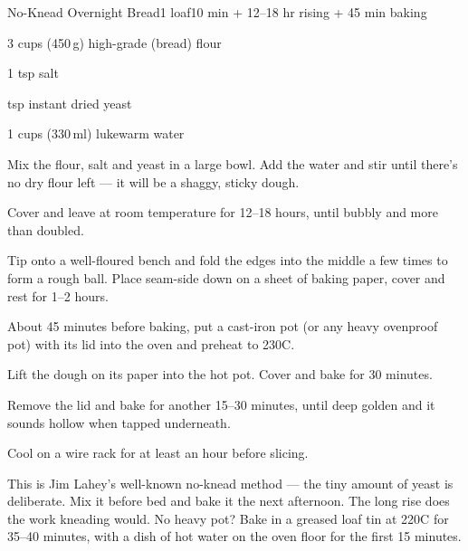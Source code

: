 \begin{recipebox}{No-Knead Overnight Bread}{1 loaf}{10 min + 12--18 hr rising + 45 min baking}
\begin{ingredients}
  \item 3 cups (450\,g) high-grade (bread) flour
  \item 1 tsp salt
  \item {} tsp instant dried yeast
  \item 1 cups (330\,ml) lukewarm water
\end{ingredients}

\begin{method}
  \item Mix the flour, salt and yeast in a large bowl. Add the water and stir until there's no dry flour left --- it will be a shaggy, sticky dough.
  \item Cover and leave at room temperature for 12--18 hours, until bubbly and more than doubled.
  \item Tip onto a well-floured bench and fold the edges into the middle a few times to form a rough ball. Place seam-side down on a sheet of baking paper, cover and rest for 1--2 hours.
  \item About 45 minutes before baking, put a cast-iron pot (or any heavy ovenproof pot) with its lid into the oven and preheat to 230\degree C.
  \item Lift the dough on its paper into the hot pot. Cover and bake for 30 minutes.
  \item Remove the lid and bake for another 15--30 minutes, until deep golden and it sounds hollow when tapped underneath.
  \item Cool on a wire rack for at least an hour before slicing.
\end{method}

\begin{notes}
This is Jim Lahey's well-known no-knead method --- the tiny amount of yeast is deliberate. Mix it before bed and bake it the next afternoon. The long rise does the work kneading would.
No heavy pot? Bake in a greased loaf tin at 220\degree C for 35--40 minutes, with a dish of hot water on the oven floor for the first 15 minutes.
\end{notes}
\end{recipebox}
